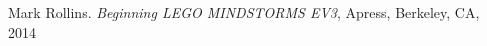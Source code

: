 \begin{thebibliography}{ABCD}

Mark Rollins. \emph{Beginning LEGO MINDSTORMS EV3}, Apress, Berkeley, CA, 2014

\end{thebibliography}